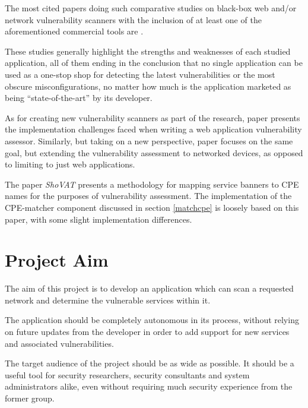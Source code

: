 \documentclass[a4paper,12pt]{article}
\begin{document}
	The most cited papers doing such comparative studies on black-box web and/or network vulnerability scanners with the inclusion of at least one of the aforementioned commercial tools are \cite{holm11,bau10,doupe10}.
	
	These studies generally highlight the strengths and weaknesses of each studied application, all of them ending in the conclusion that no single application can be used as a one-stop shop for detecting the latest vulnerabilities or the most obscure misconfigurations, no matter how much is the application marketed as being ``state-of-the-art'' by its developer.
	
	As for creating new vulnerability scanners as part of the research, paper \cite{kals06} presents the implementation challenges faced when writing a web application vulnerability assessor. Similarly, but taking on a new perspective, paper \cite{guo05} focuses on the same goal, but extending the vulnerability assessment to networked devices, as opposed to limiting to just web applications.
	
	The paper \textit{ShoVAT}\cite{shovat15} presents a methodology for mapping service banners to CPE names for the purposes of vulnerability assessment. The implementation of the CPE-matcher component discussed in section \ref{matchcpe} is loosely based on this paper, with some slight implementation differences.
	
\section{Project Aim}
 
	
	The aim of this project is to develop an application which can scan a requested network and determine the vulnerable services within it.
	
	The application should be completely autonomous in its process, without relying on future updates from the developer in order to add support for new services and associated vulnerabilities.
	
	The target audience of the project should be as wide as possible. It should be a useful tool for security researchers, security consultants and system administrators alike, even without requiring much security experience from the former group.
	
\end{document}
